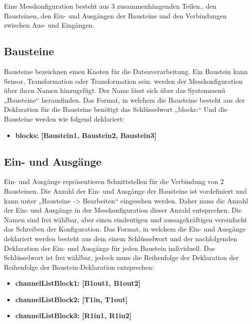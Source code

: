 \documentclass[parskip=full]{scrartcl}
\begin{document}
Eine Messkonfiguration besteht aus 3 zusammenhängenden Teilen., den Bausteinen, den Ein- und Ausgängen der Bausteine und den Verbindungen zwischen Aus- und Eingängen.  

\subsection{Bausteine}

Bausteine bezeichnen einen Knoten für die Datenverarbeitung. Ein Baustein kann 
Sensor, Transformation oder Transformation sein. werden der Messkonfiguration über ihren Namen hinzugefügt. Der Name lässt sich über das Systemmenü „Bausteine“ herausfinden.   
Das Format, in welchem die Bausteine besteht aus der Deklaration für die Bausteine benötigt das Schlüsselwort „blocks:“ Und die Bausteine werden wie folgend deklariert: 

\begin{itemize}

\item[ ] \textbf{blocks: [Baustein1, Baustein2, Baustein3]}

\end{itemize}

\subsection{Ein- und Ausgänge}

Ein- und Ausgänge repräsentieren Schnittstellen für die Verbindung von 2  
Bausteinen. Die Anzahl der Ein- und Ausgänge der Bausteine ist vordefiniert und kann unter „Bausteine -> Bearbeiten“ eingesehen werden. Daher muss die Anzahl der Ein- und Ausgänge in der Messkonfiguration dieser Anzahl entsprechen. Die Namen sind frei wählbar, aber einen eindeutigen und aussagekräftigen vereinfacht das Schreiben der Konfiguration.  
Das Format, in welchem die Ein- und Ausgänge deklariert werden besteht aus dem einem Schlüsselwort und der nachfolgenden Deklaration der Ein- und Ausgänge für jeden Baustein individuell. Das Schlüsselwort ist frei wählbar, jedoch muss die Reihenfolge der Deklaration der Reihenfolge der Baustein-Deklaration entsprechen:  

\begin{itemize}

\item[ ] \textbf{channelListBlock1: [B1out1, B1out2]}
\item[ ] \textbf{channelListBlock2: [T1in, T1out]}
\item[ ] \textbf{channelListBlock3: [R1in1, R1in2]} 

\end{itemize}
\end{document}
